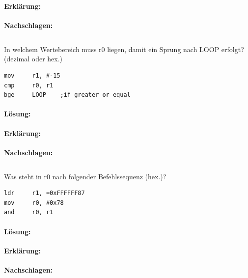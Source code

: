 \documentclass[12pt,twoside,a4paper]{article}
\begin{document}
\paragraph*{Erklärung:}

\paragraph*{Nachschlagen:}

\subsection{}
In welchem Wertebereich muss r0 liegen, damit ein Sprung nach LOOP erfolgt? (dezimal oder hex.)
\begin{lstlisting}
mov		r1, #-15
cmp		r0, r1
bge		LOOP	;if greater or equal
\end{lstlisting}


\paragraph*{Lösung:}

\paragraph*{Erklärung:}

\paragraph*{Nachschlagen:}

\subsection{}
Was steht in r0 nach folgender Befehlssequenz (hex.)?
\begin{lstlisting}
ldr		r1, =0xFFFFFF87
mov		r0, #0x78
and		r0, r1
\end{lstlisting}


\paragraph*{Lösung:}

\paragraph*{Erklärung:}

\paragraph*{Nachschlagen:}
\end{document}
